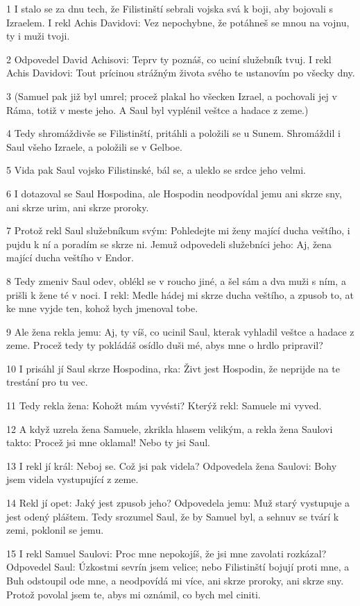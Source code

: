 \par 1 I stalo se za dnu tech, že Filistinští sebrali vojska svá k boji, aby bojovali s Izraelem. I rekl Achis Davidovi: Vez nepochybne, že potáhneš se mnou na vojnu, ty i muži tvoji.
\par 2 Odpovedel David Achisovi: Teprv ty poznáš, co uciní služebník tvuj. I rekl Achis Davidovi: Tout prícinou strážným života svého te ustanovím po všecky dny.
\par 3 (Samuel pak již byl umrel; procež plakal ho všecken Izrael, a pochovali jej v Ráma, totiž v meste jeho. A Saul byl vyplénil veštce a hadace z zeme.)
\par 4 Tedy shromáždivše se Filistinští, pritáhli a položili se u Sunem. Shromáždil i Saul všeho Izraele, a položili se v Gelboe.
\par 5 Vida pak Saul vojsko Filistinské, bál se, a uleklo se srdce jeho velmi.
\par 6 I dotazoval se Saul Hospodina, ale Hospodin neodpovídal jemu ani skrze sny, ani skrze urim, ani skrze proroky.
\par 7 Protož rekl Saul služebníkum svým: Pohledejte mi ženy mající ducha veštího, i pujdu k ní a poradím se skrze ni. Jemuž odpovedeli služebníci jeho: Aj, žena mající ducha veštího v Endor.
\par 8 Tedy zmeniv Saul odev, oblékl se v roucho jiné, a šel sám a dva muži s ním, a prišli k žene té v noci. I rekl: Medle hádej mi skrze ducha veštího, a zpusob to, at ke mne vyjde ten, kohož bych jmenoval tobe.
\par 9 Ale žena rekla jemu: Aj, ty víš, co ucinil Saul, kterak vyhladil veštce a hadace z zeme. Procež tedy ty pokládáš osídlo duši mé, abys mne o hrdlo pripravil?
\par 10 I prisáhl jí Saul skrze Hospodina, rka: Živt jest Hospodin, že neprijde na te trestání pro tu vec.
\par 11 Tedy rekla žena: Kohožt mám vyvésti? Kterýž rekl: Samuele mi vyved.
\par 12 A když uzrela žena Samuele, zkrikla hlasem velikým, a rekla žena Saulovi takto: Procež jsi mne oklamal! Nebo ty jsi Saul.
\par 13 I rekl jí král: Neboj se. Což jsi pak videla? Odpovedela žena Saulovi: Bohy jsem videla vystupující z zeme.
\par 14 Rekl jí opet: Jaký jest zpusob jeho? Odpovedela jemu: Muž starý vystupuje a jest odený pláštem. Tedy srozumel Saul, že by Samuel byl, a sehnuv se tvárí k zemi, poklonil se jemu.
\par 15 I rekl Samuel Saulovi: Proc mne nepokojíš, že jsi mne zavolati rozkázal? Odpovedel Saul: Úzkostmi sevrín jsem velice; nebo Filistinští bojují proti mne, a Buh odstoupil ode mne, a neodpovídá mi více, ani skrze proroky, ani skrze sny. Protož povolal jsem te, abys mi oznámil, co bych mel ciniti.
